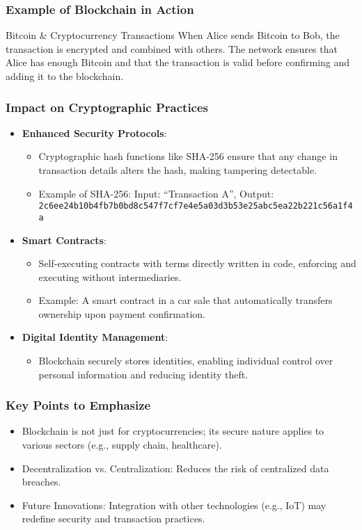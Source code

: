 \documentclass{beamer}
\begin{document}
\begin{frame}[fragile]
    \frametitle{Example of Blockchain in Action}
    \begin{block}{Bitcoin & Cryptocurrency Transactions}
        When Alice sends Bitcoin to Bob, the transaction is encrypted and combined with others. The network ensures that Alice has enough Bitcoin and that the transaction is valid before confirming and adding it to the blockchain.
    \end{block}
\end{frame}

\begin{frame}[fragile]
    \frametitle{Impact on Cryptographic Practices}
    \begin{itemize}
        \item \textbf{Enhanced Security Protocols}: 
        \begin{itemize}
            \item Cryptographic hash functions like SHA-256 ensure that any change in transaction details alters the hash, making tampering detectable.
            \item Example of SHA-256: Input: “Transaction A”, Output: \texttt{2c6ee24b10b4fb7b0bd8c547f7cf7e4e5a03d3b53e25abc5ea22b221c56a1f4a}
        \end{itemize}
        \item \textbf{Smart Contracts}: 
        \begin{itemize}
            \item Self-executing contracts with terms directly written in code, enforcing and executing without intermediaries.
            \item Example: A smart contract in a car sale that automatically transfers ownership upon payment confirmation.
        \end{itemize}
        \item \textbf{Digital Identity Management}: 
        \begin{itemize}
            \item Blockchain securely stores identities, enabling individual control over personal information and reducing identity theft.
        \end{itemize}
    \end{itemize}
\end{frame}

\begin{frame}[fragile]
    \frametitle{Key Points to Emphasize}
    \begin{itemize}
        \item Blockchain is not just for cryptocurrencies; its secure nature applies to various sectors (e.g., supply chain, healthcare).
        \item Decentralization vs. Centralization: Reduces the risk of centralized data breaches.
        \item Future Innovations: Integration with other technologies (e.g., IoT) may redefine security and transaction practices.
    \end{itemize}
\end{frame}
\end{document}
